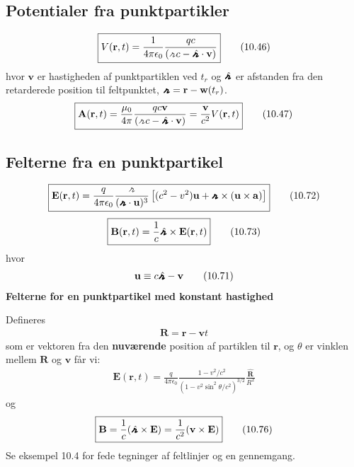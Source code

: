\documentclass[a4paper]{article}
\begin{document}
    \subsection{Potentialer fra punktpartikler}
    \begin{align*}
        \boxed{V(\mathbf{r}, t) = \frac{1}{4\pi\epsilon_0} \frac{qc}{(\griffr[2] c - \hatgriffr \cdot \mathbf{v})}} \tag{10.46}
    \end{align*} 
    hvor \(\mathbf{v}\) er hastigheden af punktpartiklen ved \(t_r\) og \(\hatgriffr \) er afstanden fra den retarderede position til feltpunktet, \(\griffr[4] = \mathbf{r} - \mathbf{w}(t_r)\).
    \begin{align*}
        \boxed{\mathbf{A}(\mathbf{r}, t) = \frac{\mu _0}{4 \pi } \frac{qc \mathbf{v}}{(\griffr[2] c - \hatgriffr \cdot \mathbf{v})} = \frac{\mathbf{v}}{c^{2} } V(\mathbf{r}, t)} \tag{10.47}
    \end{align*}
    \subsection{Felterne fra en punktpartikel}
    \begin{align*}
        \boxed{\mathbf{E}(\mathbf{r}, t) = \frac{q}{4 \pi \epsilon_0} \frac{\griffr[2] }{(\griffr[4] \cdot \mathbf{u})^3} 
        \left[ (c^2 - v^2) \mathbf{u} + \griffr[4] \times (\mathbf{u} \times \mathbf{a}) \right]} \tag{10.72}
    \end{align*}
    \begin{align*}
        \boxed{\mathbf{B}(\mathbf{r}, t) = \frac{1}{c} \hatgriffr \times \mathbf{E}(\mathbf{r}, t)} \tag{10.73}
    \end{align*}
    hvor \begin{align*}
        \mathbf{u} \equiv  c \hatgriffr - \mathbf{v} \tag{10.71}
    \end{align*}
    \textbf{Felterne for en punktpartikel med konstant hastighed}
    
    Defineres 
    \begin{align*}
        \mathbf{R} = \mathbf{r} - \mathbf{v}t
    \end{align*} 
    som er vektoren fra den \textbf{nuværende} position af partiklen til \(\mathbf{r}\), og \(\theta \) er vinklen mellem \(\mathbf{R}\) og \(\mathbf{v}\) får vi: \begin{align*}
        \boxed{\mathbf{E}(\mathbf{r}, t) = \frac{q}{4 \pi \epsilon_0} 
        \frac{1 - v^2 / c^2}{\left( 1 - v^2 \sin^2 \theta / c^2 \right)^{3/2}} 
        \frac{\hat{\mathbf{R}}}{R^2}} \tag{10.75}
    \end{align*}     
    og \begin{align*}
        \boxed{\mathbf{B} = \frac{1}{c} (\hatgriffr \times \mathbf{E}) = \frac{1}{c^{2} } (\mathbf{v} \times \mathbf{E})}\tag{10.76}
    \end{align*}
    Se eksempel 10.4 for fede tegninger af feltlinjer og en gennemgang.
\end{document}
